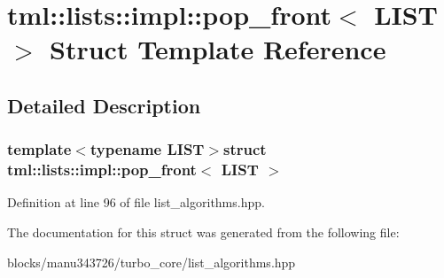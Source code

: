 \hypertarget{structtml_1_1lists_1_1impl_1_1pop__front}{\section{tml\+:\+:lists\+:\+:impl\+:\+:pop\+\_\+front$<$ L\+I\+S\+T $>$ Struct Template Reference}
\label{structtml_1_1lists_1_1impl_1_1pop__front}
}


\subsection{Detailed Description}
\subsubsection*{template$<$typename L\+I\+S\+T$>$struct tml\+::lists\+::impl\+::pop\+\_\+front$<$ L\+I\+S\+T $>$}



Definition at line 96 of file list\+\_\+algorithms.\+hpp.



The documentation for this struct was generated from the following file\+:\begin{DoxyCompactItemize}
\item 
blocks/manu343726/turbo\+\_\+core/list\+\_\+algorithms.\+hpp\end{DoxyCompactItemize}
